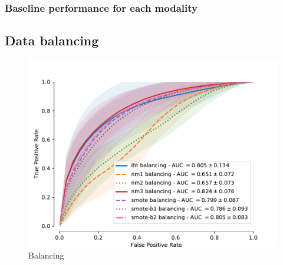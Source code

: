 \documentclass[a4paper,num-refs]{wiley-article}
\begin{document}
\begin{figure}
  \hspace*{\fill}
  \hfill
  \hspace*{\fill}
  \caption[]{}
  \label{fig:xxx}
\end{figure}

\subsubsection{Baseline performance for each modality}

\subsection{Data balancing}

\begin{figure}
  \centering
  \includegraphics[width=0.5\linewidth]{images/aggregation.pdf}
  \caption[Balancing]{Balancing}
  \label{fig:balancing}
\end{figure}
\end{document}
